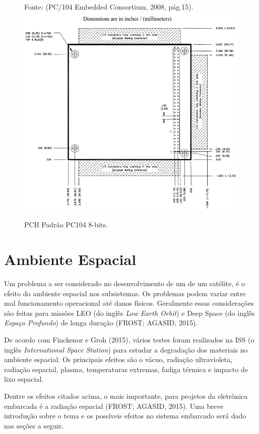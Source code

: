 \begin{figure}[h]
	\centering
    Fonte: (PC/104 Embedded Consortium, 2008, pág.15).\linebreak
	\includegraphics[keepaspectratio=true,scale=0.55]{figuras/pc104.PNG}
	\caption{ PCB Padrão PC104 8-bits.}
	\label{fig16}
\end{figure}

\section{Ambiente Espacial}
Um problema a ser considerado no desenvolvimento de um de um satélite, é o efeito do ambiente espacial nos subsistemas. Os problemas podem variar entre mal funcionamento operacional até danos físicos. Geralmente essas considerações são feitas para missões LEO (do inglês \textit{Low Earth Orbit}) e Deep Space (do inglês \textit{Espaço Profundo}) de longa duração (FROST; AGASID, 2015).

De acordo com Finckenor e Groh (2015), vários testes foram realizados na ISS (o inglês \textit{International Space Station}) para estudar a degradação dos materiais no ambiente espacial. Os principais efeitos são o vácuo, radiação ultravioleta, radiação espacial, plasma, temperaturas extremas, fadiga térmica e impacto de lixo espacial. 

Dentre os efeitos citados acima, o mais importante, para projetos da eletrônica embarcada é a radiação espacial (FROST; AGASID, 2015). Uma breve introdução sobre o tema e os possíveis efeitos no sistema embarcado será dado nas seções a seguir.

